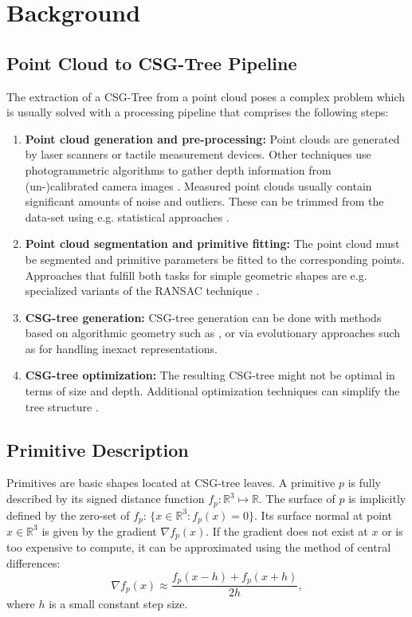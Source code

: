 \section{Background}
\label{sec:back}
\subsection{Point Cloud to \ac{CSG}-Tree Pipeline} 
The extraction of a \ac{CSG}-Tree from a point cloud poses a complex problem which is usually solved with a processing pipeline that comprises the following steps:  
\begin{enumerate}
\item \textbf{Point cloud generation and pre-processing:} Point clouds are generated by laser scanners or tactile measurement devices. 
Other techniques use photogrammetric algorithms to gather depth information from (un-)calibrated camera images \cite{hartley2003multiple}.
Measured point clouds usually contain significant amounts of noise and outliers. 
These can be trimmed from the data-set using e.g. statistical approaches  \cite{rusu20113d}.
\item \textbf{Point cloud segmentation and primitive fitting:} The point cloud must be segmented and primitive parameters be fitted to the corresponding points. Approaches that fulfill both tasks for simple geometric shapes are e.g. specialized variants of the \ac{RANSAC} technique \cite{schnabel2007efficient}.
\item \textbf{\ac{CSG}-tree generation:} \ac{CSG}-tree generation can be done with methods based on algorithmic geometry such as \cite{shapiro1993separation, buchele2004three}, or via evolutionary approaches such as \cite{fayolle2016evolutionary} for handling inexact representations.
\item \textbf {\ac{CSG}-tree optimization:} The resulting \ac{CSG}-tree might not be optimal in terms of size and depth.
Additional optimization techniques can simplify the tree structure \cite{weiss2009geometry, shapiro1991construction}. 
\end{enumerate}

\subsection{Primitive Description}
Primitives are basic shapes located at \ac{CSG}-tree leaves. 
A primitive $p$ is fully described by its 
signed distance function $f_p: \mathbb{R}^3 \mapsto \mathbb{R}$.
The surface of $p$ is implicitly defined by the zero-set of $f_p$: $\{x \in \mathbb{R}^3 : f_p(x)=0\}$.
Its surface normal at point $x \in \mathbb{R}^3$ is given by the gradient $\nabla f_p(x)$.
If the gradient does not exist at $x$ or is too expensive to compute, it can be approximated using the method of central differences:
\begin{equation}
\nabla f_p(x) \approx \frac{f_p(x - h) + f_p(x + h)}{2h},
\end{equation}
where $h$ is a small constant step size.

